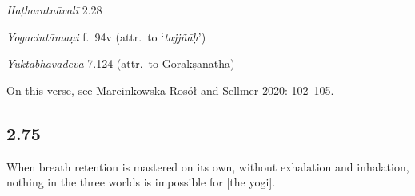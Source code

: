 \begin{ekdosis}
\begin{testimonia}[hp02_074]
\emph{Haṭharatnāvalī} 2.28

\begin{versinnote}
\end{versinnote}

\emph{Yogacintāmaṇi} f.~94v (attr.~to `\emph{tajjñāḥ}')

\begin{versinnote}
\end{versinnote}


\emph{Yuktabhavadeva} 7.124 (attr.~to Gorakṣanātha)

\begin{versinnote}
\end{versinnote}


\end{testimonia}

\begin{philcomm}[hp02_074]
On this verse, see Marcinkowska-Rosół and Sellmer 2020: 102–105.
\end{philcomm}

\subsection*{2.75}
\begin{translation}[hp02_075]
When breath retention is mastered on its own, without exhalation and inhalation, nothing in the three worlds is impossible for [the yogi].
\end{translation}



\end{ekdosis}
